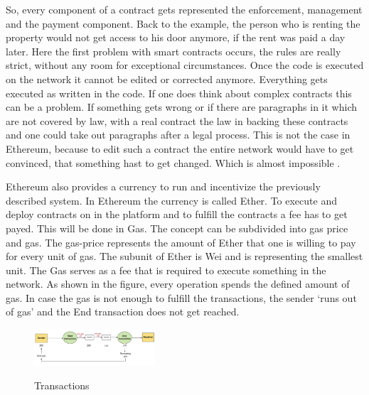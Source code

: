 So, every component of a contract gets represented the enforcement, management and the payment component.
Back to the example, the person who is renting the property would not get access to his door anymore, if the rent was paid a day later. 
Here the first problem with smart contracts occurs, the rules are really strict, without any room for exceptional circumstances. 
Once the code is executed on the network it cannot be edited or corrected anymore. 
Everything gets executed as written in the code. 
If one does think about complex contracts this can be a problem.
If something gets wrong or if there are paragraphs in it which are not covered by law, with a real contract the law in backing these contracts and one could take out paragraphs after a legal process.
This is not the case in Ethereum, because to edit such a contract the entire network would have to get convinced, that something hast to get changed. Which is almost impossible \cite{Dannen2017IES3103305}.

Ethereum also provides a currency to run and incentivize the previously described system. 
In Ethereum the currency is called Ether. 
To execute and deploy contracts on in the platform and to fulfill the contracts a fee has to get payed.
This will be done in Gas. The concept can be subdivided into gas price and gas. 
The gas-price represents the amount of Ether that one is willing to pay for every unit of gas. 
The subunit of Ether is Wei and is representing the smallest unit. 
The Gas serves as a fee that is required to execute something in the network. 
As shown in the figure, every operation spends the defined amount of gas. 
In case the gas is not enough to fulfill the transactions, the sender ‘runs out of gas’ and the End transaction does not get reached. \cite{preethi}

\begin{figure}
\caption{Transactions} 
\cite{preethi}
\includegraphics[width=0.4\textwidth]{gastransactions}
\end{figure}

